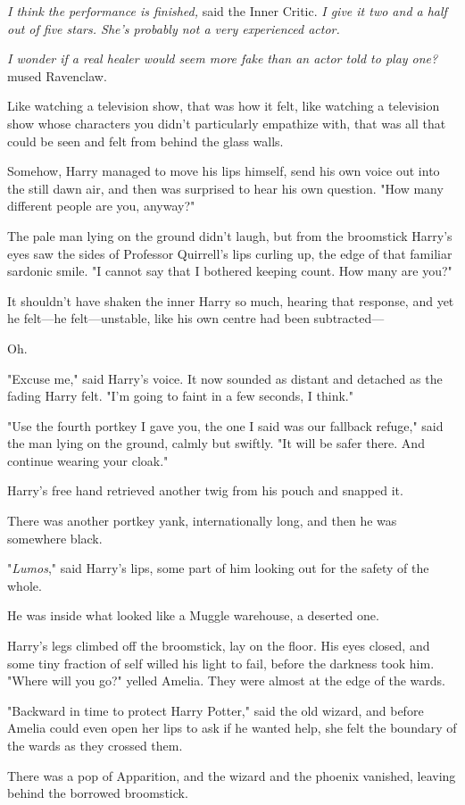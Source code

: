 \emph{I think the performance is finished,} said the Inner Critic. \emph{I give
it two and a half out of five stars. She's probably not a very experienced
actor.}

\emph{I wonder if a real healer would seem more fake than an actor told to play
one?} mused Ravenclaw.

Like watching a television show, that was how it felt, like watching a
television show whose characters you didn't particularly empathize with, that
was all that could be seen and felt from behind the glass walls.

Somehow, Harry managed to move his lips himself, send his own voice out into
the still dawn air, and then was surprised to hear his own question. "How many
different people are you, anyway?"

The pale man lying on the ground didn't laugh, but from the broomstick Harry's
eyes saw the sides of Professor Quirrell's lips curling up, the edge of that
familiar sardonic smile. "I cannot say that I bothered keeping count. How many
are you?"

It shouldn't have shaken the inner Harry so much, hearing that response, and
yet he felt---he felt---unstable, like his own centre had been subtracted---

Oh.

"Excuse me," said Harry's voice. It now sounded as distant and detached as the
fading Harry felt. "I'm going to faint in a few seconds, I think."

"Use the fourth portkey I gave you, the one I said was our fallback refuge,"
said the man lying on the ground, calmly but swiftly. "It will be safer there.
And continue wearing your cloak."

Harry's free hand retrieved another twig from his pouch and snapped it.

There was another portkey yank, internationally long, and then he was somewhere
black.

"\emph{Lumos}," said Harry's lips, some part of him looking out for the safety
of the whole.

He was inside what looked like a Muggle warehouse, a deserted one.

Harry's legs climbed off the broomstick, lay on the floor. His eyes closed, and
some tiny fraction of self willed his light to fail, before the darkness took
him.
\later
"Where will you go?" yelled Amelia. They were almost at the edge of the wards.

"Backward in time to protect Harry Potter," said the old wizard, and before
Amelia could even open her lips to ask if he wanted help, she felt the boundary
of the wards as they crossed them.

There was a pop of Apparition, and the wizard and the phoenix vanished, leaving
behind the borrowed broomstick.
